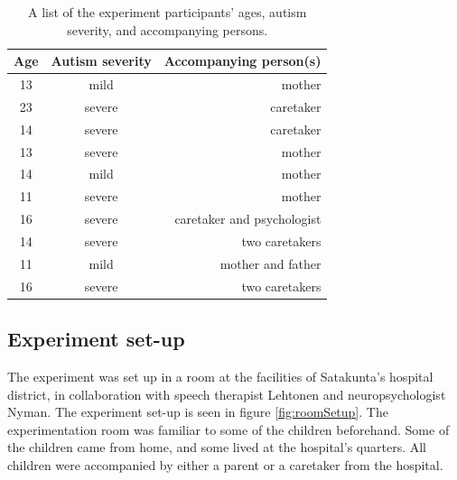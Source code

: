 \vspace{0.5cm}
\bgroup
\def\arraystretch{1.3}
\begin{table}
\centering
\begin{tabular}{ c | c | r }
  \textbf{Age} & \textbf{Autism severity} & \textbf{Accompanying person(s)}\\
  \hline
  13 & mild & mother \\
  23 & severe & caretaker \\
  14 & severe & caretaker \\
  13 & severe & mother \\
  14 & mild & mother \\
  11 & severe & mother \\
  16 & severe & caretaker and psychologist \\
  14 & severe & two caretakers \\
  11 & mild & mother and father \\
  16 & severe & two caretakers \\
\end{tabular}
\vspace{0.5cm}
\caption{A list of the experiment participants' ages, autism severity, and accompanying persons.}
\label{table:participants}
\end{table}
\egroup


\subsection{Experiment set-up}

The experiment was set up in a room at the facilities of Satakunta's hospital district, in collaboration with speech therapist Lehtonen and neuropsychologist Nyman. The experiment set-up is seen in figure \ref{fig:roomSetup}. The experimentation room was familiar to some of the children beforehand. Some of the children came from home, and some lived at the hospital's quarters. All children were accompanied by either a parent or a caretaker from the hospital.

